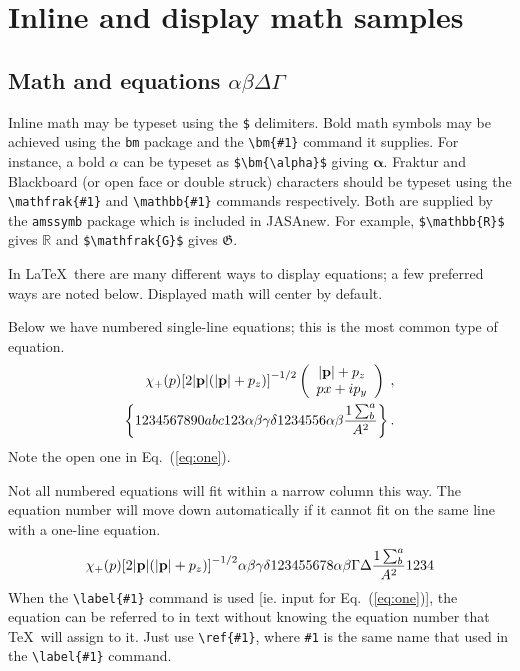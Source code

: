 \documentclass[reprint,NumberedRefs]{JASAnew}
\begin{document}
\section{Inline and display math samples\label{sec:3}}

\subsection{\label{subsec:3:3} Math and equations $\alpha\beta\Delta\Gamma$}
Inline math may be typeset using the \verb+$+ delimiters. Bold math
symbols may be achieved using the \verb+bm+ package and the
\verb+\bm{#1}+ command it supplies. For instance, a bold $\alpha$ can
be typeset as \verb+$\bm{\alpha}$+ giving $\bm{\alpha}$. Fraktur and
Blackboard (or open face or double struck) characters should be
typeset using the \verb+\mathfrak{#1}+ and \verb+\mathbb{#1}+ commands
respectively. Both are supplied by the \texttt{amssymb} package which
is included in JASAnew. For
example, \verb+$\mathbb{R}$+ gives $\mathbb{R}$ and
\verb+$\mathfrak{G}$+ gives $\mathfrak{G}$.

In \LaTeX\ there are many different ways to display equations; a
few preferred ways are noted below. Displayed math will center by
default. 

Below we have numbered single-line equations; this is the most common
type of equation.
\begin{eqnarray}
\chi_+(p){\bf [}2|{\bf p}|(|{\bf p}|+p_z){\bf ]}^{-1/2}
\left(
\begin{array}{c}
|{\bf p}|+p_z\\
px+ip_y
\end{array}\right)\;,
\\
\left\{%
 1234567890abc123\alpha\beta\gamma\delta1234556\alpha\beta
 \frac{1\sum^{a}_{b}}{A^2}%
\right\}%
\label{eq:one}.
\end{eqnarray}
Note the open one in Eq.~(\ref{eq:one}).

Not all numbered equations will fit within a narrow column this
way. The equation number will move down automatically if it cannot fit
on the same line with a one-line equation.
\begin{equation}
\chi_+(p){\bf [}2|{\bf p}|(|{\bf p}|+p_z){\bf ]}^{-1/2}
\alpha\beta\gamma\delta123455678\alpha\beta\Gamma\Delta
 \frac{1\sum^{a}_{b}}{A^2}1234%
\end{equation}
When the \verb+\label{#1}+ command is used [ie. input for
Eq.~(\ref{eq:one})], the equation can be referred to in text without
knowing the equation number that \TeX\ will assign to it. Just
use \verb+\ref{#1}+, where \verb+#1+ is the same name that used in
the \verb+\label{#1}+ command.
\end{document}
